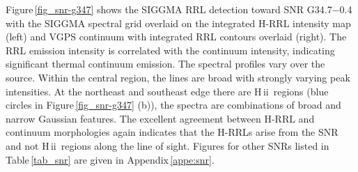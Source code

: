 \documentclass[manuscript]{aastex61}
\newcommand{\hii}{{\rm H\,}{{\sc ii}}}
\begin{document}
Figure\,\ref{fig_snr-g347} shows the SIGGMA RRL detection toward SNR G34.7$-$0.4 with the SIGGMA spectral grid overlaid on the integrated H-RRL intensity map (left) and VGPS continuum with integrated RRL contours overlaid (right).
The RRL emission intensity is correlated with the continuum intensity, indicating significant thermal continuum emission.
The spectral profiles vary over the source.
Within the central region, the lines are broad with strongly varying peak intensities.
At the northeast and southeast edge there are \hii\ regions (blue circles in Figure\,\ref{fig_snr-g347} (b)), the spectra are combinations of broad and narrow Gaussian features.  The excellent agreement between H-RRL and continuum morphologies again indicates that the H-RRLs arise from the SNR and not \hii\ regions along the line of sight.
Figures for other SNRs listed in Table\,\ref{tab_snr} are given in Appendix\,\ref{appe:snr}.
\end{document}
